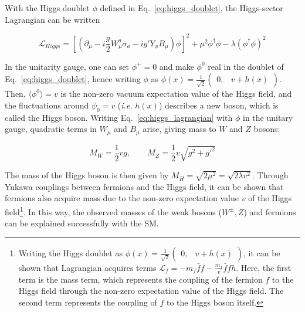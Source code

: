 With the Higgs doublet $\phi$ defined in Eq.~\ref{eq:higgs_doublet}, the Higgs-sector Lagrangian can be written

\begin{equation}
    \mathcal{L}_{Higgs} = \left[ \left( \partial_{\mu} - i \frac{g}{2} W_{\mu}^{a} \sigma_{a} - ig' Y_{\phi} B_{\mu} \right) \phi \right]^{2} + \mu^2 \phi^{\dag} \phi - \lambda \left( \phi^{\dag} \phi \right)^{2}
    \label{eq:higgs_lagrangian}
\end{equation}

In the unitarity gauge, one can set $\phi^{+} = 0$ and make $\phi^{0}$ real in the doublet of Eq.~\ref{eq:higgs_doublet}, hence writing $\phi$ as
$\phi(x) = \frac{1}{\sqrt{2}} \begin{pmatrix} 0, & v + h(x) \end{pmatrix}$. 
Then, $\langle \phi^{0} \rangle = v$ is the non-zero vacuum expectation value of the Higgs field, and the fluctuations around $\psi_{0} = v$
(\textit{i.e.} $h(x)$) describes a new boson, which is called the Higgs boson. Writing Eq.~\ref{eq:higgs_lagrangian} with $\phi$ in the unitary gauge, 
quadratic terms in $W_{\mu}$ and $B_{\mu}$ arise, giving mass to $W$ and $Z$ bosons:

\begin{equation}
    M_{W} = \frac{1}{2} v g, \qquad M_{Z} = \frac{1}{2} v \sqrt{g^2 + g'^{2}}
\end{equation}

The mass of the Higgs boson is then given by $M_{H} = \sqrt{2 \mu^2} = \sqrt{2 \lambda v^2}$. Through Yukawa couplings between fermions and the
Higgs field, it can be shown that fermions also acquire mass due to the non-zero expectation value $v$ 
of the Higgs field\footnote{Writing the Higgs doublet as $\phi(x) = \frac{1}{\sqrt{2}} \begin{pmatrix} 0, & v + h(x) \end{pmatrix}$, it can be shown that
Lagrangian acquires terms $\mathcal{L}_{f} = -m_{f} \bar{f} f - \frac{m_f}{v} \bar{f} f h $. Here, the first term is the mass term, which
represents the coupling of the fermion $f$ to the Higgs field through the non-zero expectation value of the Higgs field.
The second term represents the coupling of $f$ to the Higgs boson itself.}. In this way, the observed masses of the weak bosons ($W^{\pm}, Z$)
and fermions can be explained successfully with the SM.

